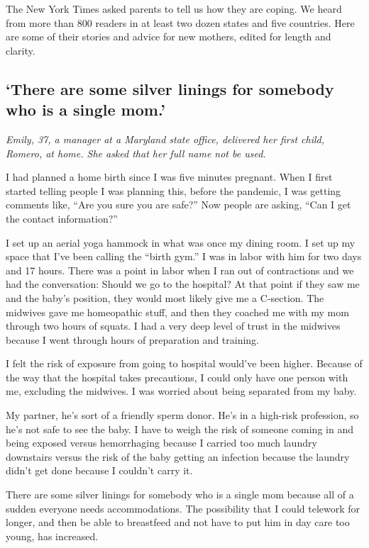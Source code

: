 The New York Times asked parents to tell us how they are coping. We
heard from more than 800 readers in at least two dozen states and five
countries. Here are some of their stories and advice for new mothers,
edited for length and clarity.

\hypertarget{there-are-some-silver-linings-for-somebody-who-is-a-single-mom}{%
\subsection{`There are some silver linings for somebody who is a single
mom.'}\label{there-are-some-silver-linings-for-somebody-who-is-a-single-mom}}

\emph{Emily, 37, a manager at a Maryland state office, delivered her
first child, Romero, at home. She asked that her full name not be used.}

I had planned a home birth since I was five minutes pregnant. When I
first started telling people I was planning this, before the pandemic, I
was getting comments like, ``Are you sure you are safe?'' Now people are
asking, ``Can I get the contact information?''

I set up an aerial yoga hammock in what was once my dining room. I set
up my space that I've been calling the ``birth gym.'' I was in labor
with him for two days and 17 hours. There was a point in labor when I
ran out of contractions and we had the conversation: Should we go to the
hospital? At that point if they saw me and the baby's position, they
would most likely give me a C-section. The midwives gave me homeopathic
stuff, and then they coached me with my mom through two hours of squats.
I had a very deep level of trust in the midwives because I went through
hours of preparation and training.

I felt the risk of exposure from going to hospital would've been higher.
Because of the way that the hospital takes precautions, I could only
have one person with me, excluding the midwives. I was worried about
being separated from my baby.

My partner, he's sort of a friendly sperm donor. He's in a high-risk
profession, so he's not safe to see the baby. I have to weigh the risk
of someone coming in and being exposed versus hemorrhaging because I
carried too much laundry downstairs versus the risk of the baby getting
an infection because the laundry didn't get done because I couldn't
carry it.

There are some silver linings for somebody who is a single mom because
all of a sudden everyone needs accommodations. The possibility that I
could telework for longer, and then be able to breastfeed and not have
to put him in day care too young, has increased.

